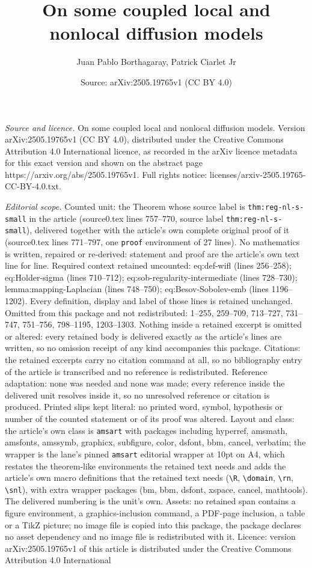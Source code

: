 \documentclass[10pt,a4paper]{amsart}
\title[On some coupled local and nonlocal diffusion models]{On some coupled local and nonlocal diffusion models}
\author{Juan Pablo Borthagaray, Patrick Ciarlet Jr}
\date{Source: arXiv:2505.19765v1 (CC BY 4.0)}
\begin{document}
\maketitle

\noindent\emph{Source and licence.} On some coupled local and nonlocal diffusion models. Version arXiv:2505.19765v1 (CC BY 4.0), distributed under the Creative Commons Attribution 4.0 International licence, as recorded in the arXiv licence metadata for this exact version and shown on the abstract page https://arxiv.org/abs/2505.19765v1. Full rights notice: licenses/arxiv-2505.19765-CC-BY-4.0.txt.\par\smallskip

\noindent\textit{Editorial scope.} Counted unit: the Theorem whose source label is \texttt{thm:reg-nl-s-small} in the article (source0.tex lines 757--770, source label \texttt{thm:reg-nl-s-small}), delivered together with the article's own complete original proof of it (source0.tex lines 771--797, one \texttt{proof} environment of 27 lines). No mathematics is written, repaired or re-derived: statement and proof are the article's own text line for line. Required context retained uncounted: eq:def-wifl (lines 256--258); eq:Holder-sigma (lines 710--712); eq:sob-regularity-intermediate (lines 728--730); lemma:mapping-Laplacian (lines 748--750); eq:Besov-Sobolev-emb (lines 1196--1202). Every definition, display and label of those lines is retained unchanged. Omitted from this package and not redistributed: 1--255, 259--709, 713--727, 731--747, 751--756, 798--1195, 1203--1303. Nothing inside a retained excerpt is omitted or altered: every retained body is delivered exactly as the article's lines are written, so no omission receipt of any kind accompanies this package. Citations: the retained excerpts carry no citation command at all, so no bibliography entry of the article is transcribed and no reference is redistributed. Reference adaptation: none was needed and none was made; every reference inside the delivered unit resolves inside it, so no unresolved reference or citation is produced. Printed slips kept literal: no printed word, symbol, hypothesis or number of the counted statement or of its proof was altered. Layout and class: the article's own class is \texttt{amsart} with packages including hyperref, amsmath, amsfonts, amssymb, graphicx, subfigure, color, dsfont, bbm, cancel, verbatim; the wrapper is the lane's pinned \texttt{amsart} editorial wrapper at 10pt on A4, which restates the theorem-like environments the retained text needs and adds the article's own macro definitions that the retained text needs (\texttt{\textbackslash R}, \texttt{\textbackslash domain}, \texttt{\textbackslash rn}, \texttt{\textbackslash snl}), with extra wrapper packages (bm, bbm, dsfont, xspace, cancel, mathtools). The delivered numbering is the unit's own. Assets: no retained span contains a figure environment, a graphics-inclusion command, a PDF-page inclusion, a table or a TikZ picture; no image file is copied into this package, the package declares no asset dependency and no image file is redistributed with it. Licence: version arXiv:2505.19765v1 of this article is distributed under the Creative Commons Attribution 4.0 International 
\end{document}
